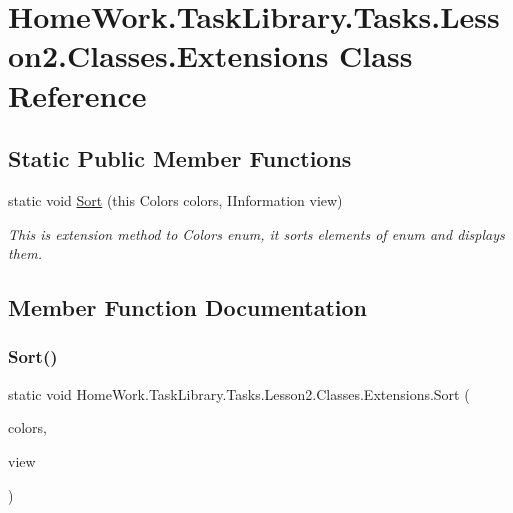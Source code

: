 \hypertarget{class_home_work_1_1_task_library_1_1_tasks_1_1_lesson2_1_1_classes_1_1_extensions}{}\section{Home\+Work.\+Task\+Library.\+Tasks.\+Lesson2.\+Classes.\+Extensions Class Reference}
\label{class_home_work_1_1_task_library_1_1_tasks_1_1_lesson2_1_1_classes_1_1_extensions}
\subsection*{Static Public Member Functions}
\begin{DoxyCompactItemize}
\item 
static void \mbox{\hyperlink{class_home_work_1_1_task_library_1_1_tasks_1_1_lesson2_1_1_classes_1_1_extensions_ac40cc9a3f5cddd74726203ef5634c980}{Sort}} (this Colors colors, I\+Information view)
\begin{DoxyCompactList}\small\item\em This is extension method to Colors enum, it sorts elements of enum and displays them. \end{DoxyCompactList}\end{DoxyCompactItemize}


\subsection{Member Function Documentation}
\mbox{\label{class_home_work_1_1_task_library_1_1_tasks_1_1_lesson2_1_1_classes_1_1_extensions_ac40cc9a3f5cddd74726203ef5634c980}} 
\subsubsection{\texorpdfstring{Sort()}{Sort()}}
{\footnotesize\ttfamily static void Home\+Work.\+Task\+Library.\+Tasks.\+Lesson2.\+Classes.\+Extensions.\+Sort (\begin{DoxyParamCaption}\item[{this Colors}]{colors,  }\item[{I\+Information}]{view }\end{DoxyParamCaption})\hspace{0.3cm}{\ttfamily [static]}}



